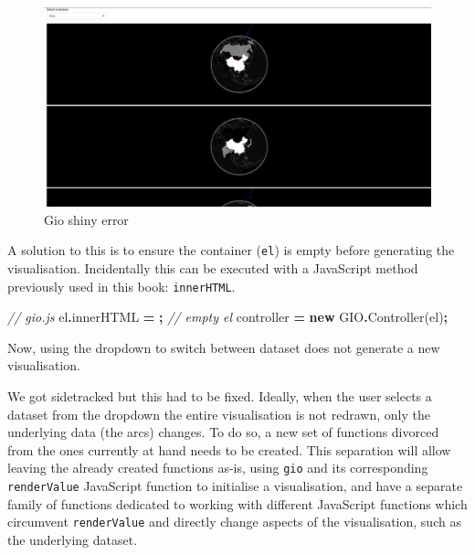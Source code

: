 \documentclass[
]{krantz}
\makeatletter
\newenvironment{Shaded}{\begin{snugshade}}{\end{snugshade}}
\newcommand{\AttributeTok}[1]{\textcolor[rgb]{0.61,0.61,0.61}{#1}}
\newcommand{\CommentTok}[1]{\textcolor[rgb]{0.37,0.37,0.37}{\textit{#1}}}
\newcommand{\FunctionTok}[1]{\textcolor[rgb]{0,0,0}{#1}}
\newcommand{\KeywordTok}[1]{\textcolor[rgb]{0.27,0.27,0.27}{\textbf{#1}}}
\newcommand{\NormalTok}[1]{#1}
\newcommand{\OperatorTok}[1]{\textcolor[rgb]{0.43,0.43,0.43}{\textbf{#1}}}
\newcommand{\StringTok}[1]{\textcolor[rgb]{0.5,0.5,0.5}{#1}}
\newenvironment{kframe}{%
\medskip{}
\setlength{\fboxsep}{.8em}
 \def\at@end@of@kframe{}%
 \ifinner\ifhmode%
  \def\at@end@of@kframe{\end{minipage}}%
  \begin{minipage}{\columnwidth}%
 \fi\fi%
 \def\FrameCommand##1{\hskip\@totalleftmargin \hskip-\fboxsep
 \colorbox{shadecolor}{##1}\hskip-\fboxsep
     \hskip-\linewidth \hskip-\@totalleftmargin \hskip\columnwidth}%
 \MakeFramed {\advance\hsize-\width
   \@totalleftmargin\z@ \linewidth\hsize
   \@setminipage}}%
 {\par\unskip\endMakeFramed%
 \at@end@of@kframe}
\renewenvironment{Shaded}{\begin{kframe}}{\end{kframe}}
\makeatother
\begin{document}
\begin{figure}
\centering
\includegraphics{images/gio-shiny-error.png}
\caption{Gio shiny error}
\end{figure}

A solution to this is to ensure the container (\texttt{el}) is empty before generating the visualisation. Incidentally this can be executed with a JavaScript method previously used in this book: \texttt{innerHTML}.

\begin{Shaded}
\begin{Highlighting}[]
\CommentTok{// gio.js}
\NormalTok{el}\OperatorTok{.}\AttributeTok{innerHTML} \OperatorTok{=} \StringTok{\textquotesingle{}\textquotesingle{}}\OperatorTok{;} \CommentTok{// empty el}
\NormalTok{controller }\OperatorTok{=} \KeywordTok{new}\NormalTok{ GIO}\OperatorTok{.}\FunctionTok{Controller}\NormalTok{(el)}\OperatorTok{;}
\end{Highlighting}
\end{Shaded}

Now, using the dropdown to switch between dataset does not generate a new visualisation.

We got sidetracked but this had to be fixed. Ideally, when the user selects a dataset from the dropdown the entire visualisation is not redrawn, only the underlying data (the arcs) changes. To do so, a new set of functions divorced from the ones currently at hand needs to be created. This separation will allow leaving the already created functions as-is, using \texttt{gio} and its corresponding \texttt{renderValue} JavaScript function to initialise a visualisation, and have a separate family of functions dedicated to working with different JavaScript functions which circumvent \texttt{renderValue} and directly change aspects of the visualisation, such as the underlying dataset.
\end{document}
